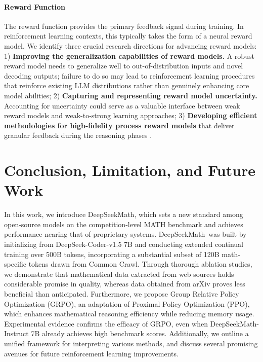 \paragraph{Reward Function} The reward function provides the primary feedback signal during training. In reinforcement learning contexts, this typically takes the form of a neural reward model. We identify three crucial research directions for advancing reward models: 1) \textbf{Improving the generalization capabilities of reward models.} A robust reward model needs to generalize well to out-of-distribution inputs and novel decoding outputs; failure to do so may lead to reinforcement learning procedures that reinforce existing LLM distributions rather than genuinely enhancing core model abilities; 2) \textbf{Capturing and representing reward model uncertainty.} Accounting for uncertainty could serve as a valuable interface between weak reward models and weak-to-strong learning approaches; 3) \textbf{Developing efficient methodologies for high-fidelity process reward models} that deliver granular feedback during the reasoning phases \citep{lightman2023let,wang2023math}.

\section{Conclusion, Limitation, and Future Work} In this work, we introduce DeepSeekMath, which sets a new standard among open-source models on the competition-level MATH benchmark and achieves performance nearing that of proprietary systems. DeepSeekMath~was built by initializing from DeepSeek-Coder-v1.5 7B and conducting extended continual training over 500B tokens, incorporating a substantial subset of 120B math-specific tokens drawn from Common Crawl. Through thorough ablation studies, we demonstrate that mathematical data extracted from web sources holds considerable promise in quality, whereas data obtained from arXiv proves less beneficial than anticipated. Furthermore, we propose Group Relative Policy Optimization (GRPO), an adaptation of Proximal Policy Optimization (PPO), which enhances mathematical reasoning efficiency while reducing memory usage. Experimental evidence confirms the efficacy of GRPO, even when DeepSeekMath-Instruct 7B already achieves high benchmark scores. Additionally, we outline a unified framework for interpreting various methods, and discuss several promising avenues for future reinforcement learning improvements.

